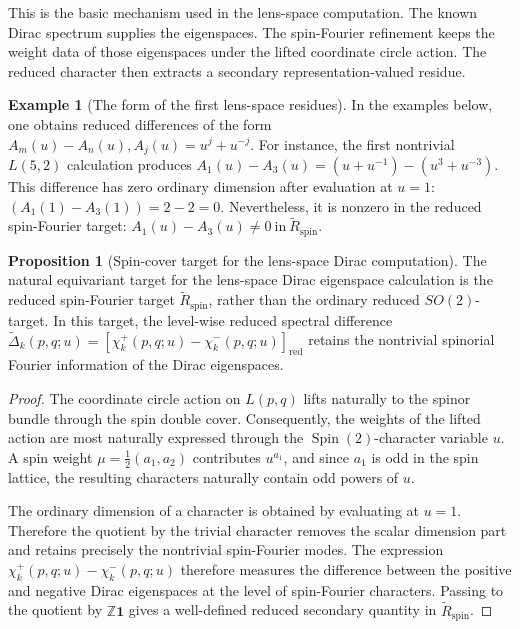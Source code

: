\documentclass{article}
\theoremstyle{definition}
\newtheorem{proposition}[theorem]{Proposition}
\newtheorem{example}[theorem]{Example}
\numberwithin{equation}{section}
\begin{document}
This is the basic mechanism used in the lens-space computation.  The known Dirac spectrum supplies the eigenspaces.  The spin-Fourier refinement keeps the weight data of those eigenspaces under the lifted coordinate circle action.  The reduced character then extracts a secondary representation-valued residue.

\begin{example}[The form of the first lens-space residues]
In the examples below, one obtains reduced differences of the form $A_m(u)-A_n(u), A_j(u)=u^j+u^{-j}.$ For instance, the first nontrivial $L(5,2)$ calculation produces $A_1(u)-A_3(u) = (u+u^{-1})-(u^3+u^{-3}).$ This difference has zero ordinary dimension after evaluation at $u=1$: $\left(A_1(1)-A_3(1)\right)=2-2=0.$ Nevertheless, it is nonzero in the reduced spin-Fourier target: $A_1(u)-A_3(u)\neq 0 \ \text{in} \ \widetilde R_{\operatorname{spin}}.$ \end{example}

\begin{proposition}[Spin-cover target for the lens-space Dirac computation]
The natural equivariant target for the lens-space Dirac eigenspace calculation is the reduced spin-Fourier target $\widetilde R_{\operatorname{spin}}$, rather than the ordinary reduced $SO(2)$-target.  In this target, the level-wise reduced spectral difference $\widetilde\Delta_k(p,q;u)=[\chi_k^+(p,q;u)-\chi_k^-(p,q;u)]_{\operatorname{red}}$ retains the nontrivial spinorial Fourier information of the Dirac eigenspaces.
\end{proposition}

\begin{proof}
The coordinate circle action on $L(p,q)$ lifts naturally to the spinor bundle through the spin double cover.  Consequently, the weights of the lifted action are most naturally expressed through the $\operatorname{Spin}(2)$-character variable $u$.  A spin weight $\mu=\frac12(a_1,a_2)$ contributes $u^{a_1}$, and since $a_1$ is odd in the spin lattice, the resulting characters naturally contain odd powers of $u$.

The ordinary dimension of a character is obtained by evaluating at $u=1$.  Therefore the quotient by the trivial character removes the scalar dimension part and retains precisely the nontrivial spin-Fourier modes.  The expression $\chi_k^+(p,q;u)-\chi_k^-(p,q;u)$ therefore measures the difference between the positive and negative Dirac eigenspaces at the level of spin-Fourier characters.  Passing to the quotient by $\mathbb Z\mathbf 1$ gives a well-defined reduced secondary quantity in $\widetilde R_{\operatorname{spin}}$.
\end{proof}
\end{document}
